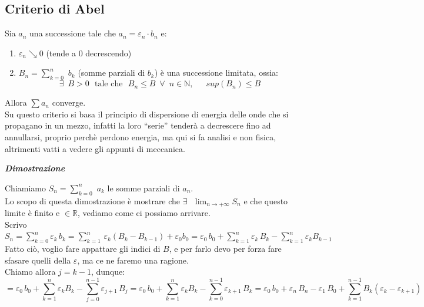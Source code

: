 \documentclass{article}
\theoremstyle{definition}
\newcommand{\R}{\mathbb{R}}
\newcommand{\N}{\mathbb{N}}
\newcommand{\virgolette}[1]{``#1''}
\begin{document}
\subsection{Criterio di Abel}
Sia $a_n$ una successione tale che $a_n = \varepsilon_n \cdot b_n$ e:
\begin{enumerate}
    \item $\varepsilon_n \searrow 0$ (tende a 0 decrescendo)
    \item $B_n= \sum_{k=0}^n \,\, b_k$ (somme parziali di $b_k$) è una successione limitata, ossia:
    \begin{equation*}
        \exists \,\,\, B>0 \,\,\,\, \mbox{tale che} \,\,\,\, B_n \leqslant B \,\,\, \forall \,\,\, n \in \N, \,\,\,\,\,\,\,\,\, sup(B_n) \leqslant B
    \end{equation*}
\end{enumerate}
Allora $\sum a_n$ converge.
\\
Su questo criterio si basa il principio di dispersione di energia delle onde che si propagano in un mezzo, infatti la loro \virgolette{serie} tenderà a decrescere fino ad annullarsi, proprio perchè perdono energia, ma qui si fa analisi e non fisica, altrimenti vatti a vedere gli appunti di meccanica.
\newpage
\begin{center}
    \textbf{\textit{Dimostrazione}}
\end{center}
Chiamiamo $S_n=\sum_{k=0}^n \,\, a_k$ le somme parziali di $a_n$.
\\
Lo scopo di questa dimostrazione è mostrare che $\exists \,\,\,\, \lim_{n \to +\infty}S_n$ e che questo limite è finito e $\in \R$, vediamo come ci possiamo arrivare.
\\
Scrivo $S_n=\sum_{k=0}^n \varepsilon_k\,b_k=\sum_{k=1}^n \, \varepsilon_k(B_k-B_{k-1})+\varepsilon_0b_0= \varepsilon_0 \, b_0 + \sum_{k=1}^n \varepsilon_k \, B_k - \sum_{k=1}^n \varepsilon_kB_{k-1}$
\\
Fatto ciò, voglio fare appattare gli indici di $B$, e per farlo devo per forza fare sfasare quelli della $\varepsilon$, ma ce ne faremo una ragione.
\\
Chiamo allora $j=k-1$, dunque:
\begin{equation*}
    =\varepsilon_0 \, b_0 + \sum_{k=1}^n \varepsilon_k B_k- \sum_{j=0}^{n-1} \varepsilon_{j+1} \, B_j = \varepsilon_0 \, b_0 + \sum_{k=1}^n\varepsilon_k B_k-\sum_{k=0}^{n-1} \varepsilon_{k+1} \, B_k = \varepsilon_0 \, b_0 + \varepsilon_n \, B_n - \varepsilon_1 \, B_0 + \sum_{k=1}^{n-1}B_k (\varepsilon_k - \varepsilon_{k+1})
\end{equation*}
\end{document}

